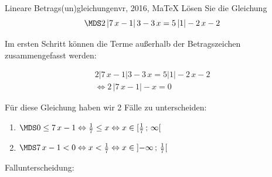  \providecommand{\MoIl}[1][]{\mbox{}#1]\mathopen{}} 
 \providecommand{\MoIr}[1][]{#1[\mbox{}} 
 \providecommand{\MIntvlSep}{;} 
 \providecommand{\MElSetSep}{\, ; \, } 
 \begin{MAufgabe}{Lineare Betrags(un)gleichungen}{vr, 2016, MaTeX}
L\"osen Sie die Gleichung
$$
 \MDS 2\left| 7\, x - 1 \right|3 - 3\, x= 5 \left| 1 \right|  - 2\, x - 2
$$  

\ifLsg\MLoesung

Im ersten Schritt k\"onnen die Terme au\ss{}erhalb der Betragszeichen zusammengefasst werden:

\begin{align*} 
 2\left| 7\, x - 1 \right|3 - 3\, x= 5 \left| 1 \right|  - 2\, x - 2\\ 
\Leftrightarrow2\, \left|7\, x - 1\right| - x= 0 
 \end{align*}

F\"ur diese Gleichung haben wir 2 F\"alle zu unterscheiden: 
\begin{enumerate}
\item $ \MDS 
0 \leq 7\, x - 1
\Leftrightarrow \frac{1}{7} \leq x\Leftrightarrow x \in [ \frac{1}{7} \, \MIntvlSep \, \infty\MoIr $ 
\item $ \MDS 
7\, x - 1 < 0
\Leftrightarrow x < \frac{1}{7}\Leftrightarrow x \in \MoIl  -\infty \, \MIntvlSep \, \frac{1}{7}\MoIr $ 
\end{enumerate} 
Fallunterscheidung: 


\end{MAufgabe}
